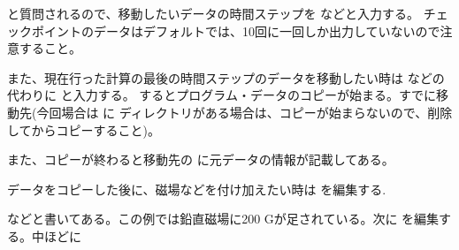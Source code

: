 \documentclass[letterpaper,10pt,dvipdfmx,report]{sphinxmanual}
\begin{document}
\begin{sphinxVerbatim}[commandchars=\\\{\}]
         
\end{sphinxVerbatim}

と質問されるので、移動したいデータの時間ステップを  などと入力する。
チェックポイントのデータはデフォルトでは、10回に一回しか出力していないので注意すること。

また、現在行った計算の最後の時間ステップのデータを移動したい時は  などの代わりに
 と入力する。
するとプログラム・データのコピーが始まる。すでに移動先(今回場合は  に  ディレクトリがある場合は、コピーが始まらないので、削除してからコピーすること)。

また、コピーが終わると移動先の  に元データの情報が記載してある。

データをコピーした後に、磁場などを付け加えたい時は  を編集する.

\begin{sphinxVerbatim}[commandchars=\\\{\}]
  
  
  
       
     
     
\end{sphinxVerbatim}

などと書いてある。この例では鉛直磁場に200 Gが足されている。次に  を編集する。中ほどに
\end{document}

